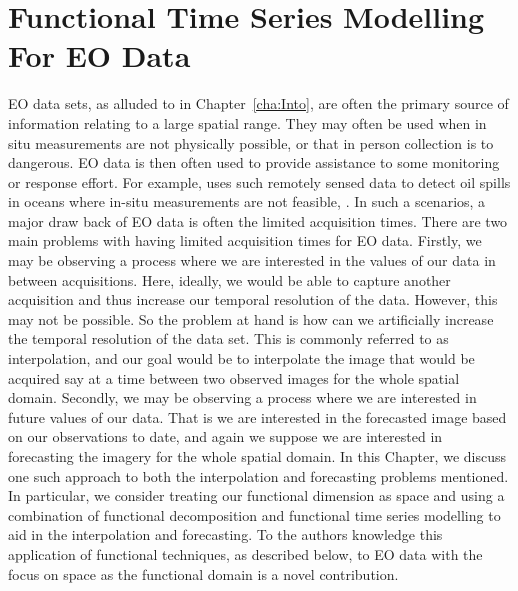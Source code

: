 
\chapter{Functional Time Series Modelling For EO Data \label{cha:ftsm}}  %



\ifpdf
    \graphicspath{{Chapter4/Figs/Raster/}{Chapter4/Figs/PDF/}{Chapter4/Figs/}}
\else
    \graphicspath{{Chapter4/Figs/Vector/}{Chapter4/Figs/}}
\fi

EO data sets, as alluded to in Chapter~\ref{cha:Into}, are often the primary source of information relating to a large spatial range.
They may often be used when in situ measurements are not physically possible, or that in person collection is to dangerous.
EO data is then often used to provide assistance to some monitoring or response effort.
For example, \citeauthor{singha_satellite_2013} uses such remotely sensed data to detect oil spills in oceans where in-situ measurements are not feasible, \citep{singha_satellite_2013}.
In such a scenarios, a major draw back of EO data is often the limited acquisition times.
There are two main problems with having limited acquisition times for EO data.
Firstly, we may be observing a process where we are interested in the values of our data in between acquisitions.
Here, ideally, we would be able to capture another acquisition and thus increase our temporal resolution of the data.
However, this may not be possible.
So the problem at hand is how can we artificially increase the temporal resolution of the data set.
This is commonly referred to as interpolation, and our goal would be to interpolate the image that would be acquired say at a time between two observed images for the whole spatial domain.
Secondly, we may be observing a process where we are interested in future values of our data. That is we are interested in the forecasted image based on our observations to date, and again we suppose we are interested in forecasting the imagery for the whole spatial domain.
In this Chapter, we discuss one such approach to both the interpolation and forecasting problems mentioned. In particular, we consider treating our functional dimension as space and using a combination of functional decomposition and functional time series modelling to aid in the interpolation and forecasting. To the authors knowledge this application of functional techniques, as described below, to EO data with the focus on space as the functional domain  is a novel contribution. 

